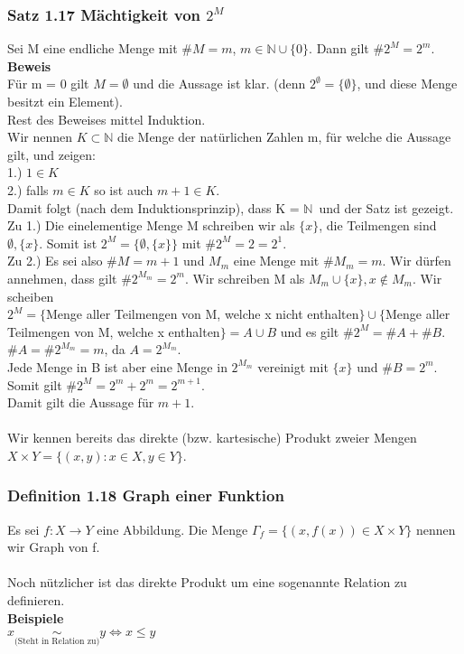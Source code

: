 \documentclass{article}
\newcommand{\N}{\mathbb{N}}
\newcommand{\mN}{$\mathbb{N}$}
\begin{document}
\subsubsection{Satz 1.17 Mächtigkeit von $2^M$}
Sei M eine endliche Menge mit $\#M = m$, $m \in \N \cup \{0\}$. Dann gilt $\#2^M = 2^m$.\\
\textbf{Beweis}\\
Für m = 0 gilt $M = \emptyset$ und die Aussage ist klar. (denn $2^\emptyset = \{\emptyset\}$, und diese Menge besitzt ein Element).\\
Rest des Beweises mittel Induktion.\\
Wir nennen $K \subset \N$ die Menge der natürlichen Zahlen m, für welche die Aussage gilt, und zeigen:\\
1.) $1 \in K$\\
2.) falls $m \in K$ so ist auch $m + 1 \in K$.\\
Damit folgt (nach dem Induktionsprinzip), dass  K = \mN\ und der Satz ist gezeigt.\\
Zu 1.) Die einelementige Menge M schreiben wir als $\{x\}$, die Teilmengen sind $\emptyset, \{x\}$. Somit ist $2^M = \{\emptyset, \{x\}\}$ mit $\#2^M = 2 = 2^1$.\\
Zu 2.) Es sei also $\#M = m + 1$  und $M_m$ eine Menge mit $\# M_m = m$. Wir dürfen annehmen, dass gilt $\#2^{M_m} = 2^m$. Wir schreiben M als $M_m \cup \{x\}, x \not\in M_m$. Wir scheiben\\
$2^M = \{$Menge aller Teilmengen von M, welche x nicht enthalten$\} \cup \{$Menge aller Teilmengen von M, welche x enthalten$\} = A \cup B$ und es gilt $\#2^M = \#A + \#B$.\\
$\#A = \#2^{M_m} = m$, da $A = 2^{M_m}$.\\
Jede Menge in B ist aber eine Menge in $2^{M_m}$ vereinigt mit $\{x\}$ und $\#B = 2^m$. Somit gilt $\#2^M = 2^m + 2^m = 2^{m + 1}$.\\
Damit gilt die Aussage für $m + 1$.\\
\\
Wir kennen bereits das direkte (bzw. kartesische) Produkt zweier Mengen $X \times Y = \{(x, y) : x\in X, y \in Y\}$.\\

\subsubsection{Definition 1.18 Graph einer Funktion}
Es sei $f : X \to Y$ eine Abbildung. Die Menge $\Gamma_f = \{(x, f(x)) \in X \times Y\}$ nennen wir Graph von f.\\
\\
Noch nützlicher ist das direkte Produkt um eine sogenannte Relation zu definieren.\\
\textbf{Beispiele}\\
$x \underset{\text{(Steht in Relation zu)}}{\sim} y \Leftrightarrow x \le y$\\
\end{document}
